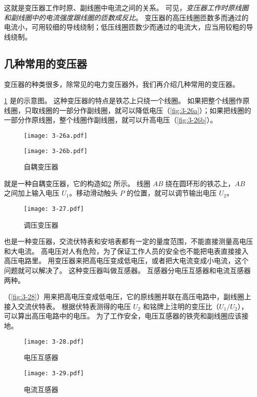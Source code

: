 这就是变压器工作时原、副线圈中电流之间的关系。
可见，\emph{变压器工作时原线圈和副线圈中的电流强度跟线圈的匝数成反比}。
变压器的高压线圈匝数多而通过的电流小，可用较细的导线绕制；低压线圈匝数少而通过的电流大，应当用较粗的导线绕制。

\subsection{几种常用的变压器}

变压器的种类很多，除常见的电力变压器外，我们再介绍几种常用的变压器。

\cref{fig:3-26} 是的示意图。
这种变压器的特点是铁芯上只绕一个线圈。
如果把整个线圈作原线圈，只取线圈的一部分作副线圈，就可以降低电压（\cref{fig:3-26a}）；如果把线圈的一部分作原线圈，整个线圈作副线圈，就可以升高电压（\cref{fig:3-26b}）。
\begin{figure}
  \begin{minipage}[b]{0.48\linewidth}\centering
    \texttt{[image: 3-26a.pdf]}
    \subcaption{}\label{fig:3-26a}
  \end{minipage}
  \begin{minipage}[b]{0.48\linewidth}\centering
    \texttt{[image: 3-26b.pdf]}
    \subcaption{}\label{fig:3-26b}
  \end{minipage}
  \caption{自耦变压器}\label{fig:3-26}
\end{figure}

就是一种自耦变压器，它的构造如\cref{fig:3-27} 所示。
线圈 $AB$ 绕在圆环形的铁芯上，$AB$ 之间加上输入电压 $U_1$。移动滑动触头 $P$ 的位置，就可以调节输出电压 $U_2$。
\begin{figure}
  \texttt{[image: 3-27.pdf]}
  \caption{调压变压器}\label{fig:3-27}
\end{figure}

也是一种变压器，交流伏特表和安培表都有一定的量度范围，不能直接测量高电压和大电流。
高电压对人有危险，为了保证工作人员的安全也不能把电表直接接入高压电路里。
用变压器来把高电压变成低电压，或者把大电流变成小电流，这个问题就可以解决了。
这种变压器叫做互感器。
互感器分电压互感器和电流互感器两种。

（\cref{fig:3-28}）用来把高电压变成低电压，它的原线圈并联在高压电路中，副线圈上接入交流伏特表。
根据伏特表测得的电压 $U_2$ 和铭牌上注明的变压比（$U_1/U_2$），可以算出高压电路中的电压。
为了工作安全，电压互感器的铁壳和副线圈应该接地。

\begin{figure}
	\begin{minipage}[b]{0.48\linewidth}\centering
    \texttt{[image: 3-28.pdf]}
    \caption{电压互感器}\label{fig:3-28}
	\end{minipage}
	\begin{minipage}[b]{0.48\linewidth}\centering
    \texttt{[image: 3-29.pdf]}
    \caption{电流互感器}\label{fig:3-29}
	\end{minipage}
\end{figure}

